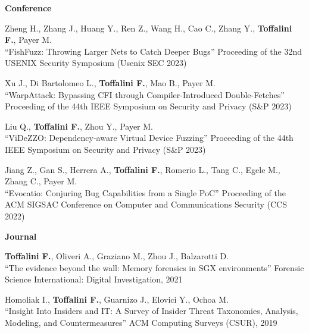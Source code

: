 \textbf{Conference}\begin{enumerate}[label={[C\arabic*]},leftmargin=5mm]
\item Zheng H., Zhang J., Huang Y., Ren Z., Wang H., Cao C., Zhang Y., \textbf{Toffalini F.}, Payer M.\\``FishFuzz: Throwing Larger Nets to Catch Deeper Bugs'' Proceeding of the 32nd USENIX Security Symposium (Usenix SEC 2023)
\item Xu J., Di Bartolomeo L., \textbf{Toffalini F.}, Mao B., Payer M.\\``WarpAttack: Bypassing CFI through Compiler-Introduced Double-Fetches'' Proceeding of the 44th IEEE Symposium on Security and Privacy (S\&P 2023)
\item Liu Q., \textbf{Toffalini F.}, Zhou Y., Payer M.\\``ViDeZZO: Dependency-aware Virtual Device Fuzzing'' Proceeding of the 44th IEEE Symposium on Security and Privacy (S\&P 2023)
\item Jiang Z., Gan S., Herrera A., \textbf{Toffalini F.}, Romerio L., Tang C., Egele M., Zhang C., Payer M.\\``Evocatio: Conjuring Bug Capabilities from a Single PoC'' Proceeding of the ACM SIGSAC Conference on Computer and Communications Security (CCS 2022)
\end{enumerate}
\textbf{Journal}\begin{enumerate}[label={[J\arabic*]},leftmargin=5mm]
\item \textbf{Toffalini F.}, Oliveri A., Graziano M., Zhou J., Balzarotti D.\\``The evidence beyond the wall: Memory forensics in SGX environments'' Forensic Science International: Digital Investigation, 2021
\item Homoliak I., \textbf{Toffalini F.}, Guarnizo J., Elovici Y., Ochoa M.\\``Insight Into Insiders and IT: A Survey of Insider Threat Taxonomies, Analysis, Modeling, and Countermeasures'' ACM Computing Surveys (CSUR), 2019
\end{enumerate}
